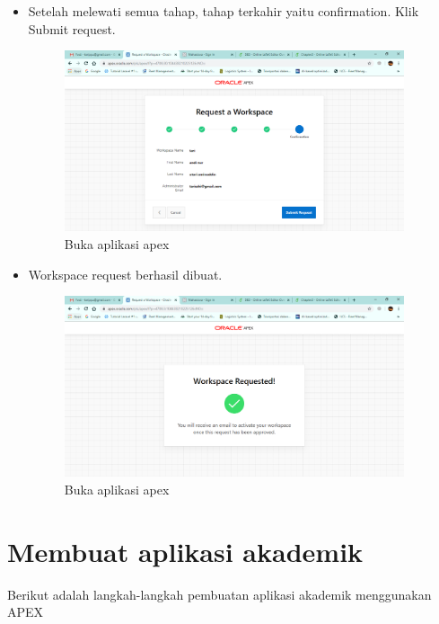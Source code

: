 \begin{itemize}
    \item Setelah melewati semua tahap, tahap terkahir yaitu confirmation. Klik Submit request.
    \begin{figure}[!htbp]
        \centering
        \includegraphics[width=10cm]{figures/work6.PNG}
        \caption{Buka aplikasi apex}
    \end{figure}
    
    \newpage
    
    \item Workspace request berhasil dibuat.
    \begin{figure}[!htbp]
        \centering
        \includegraphics[width=10cm]{figures/workberhasil.PNG}
        \caption{Buka aplikasi apex}
    \end{figure}
\end{itemize}


\section{Membuat aplikasi akademik}
Berikut adalah langkah-langkah pembuatan aplikasi akademik menggunakan APEX

